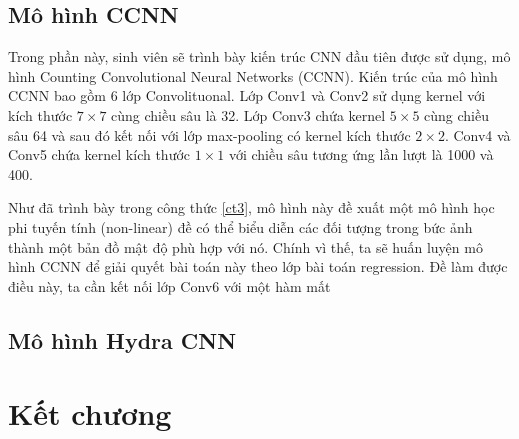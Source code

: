 \subsection{Mô hình CCNN}
	Trong phần này, sinh viên sẽ trình bày kiến trúc CNN đầu tiên được sử dụng, mô hình Counting Convolutional Neural Networks (CCNN). Kiến trúc của mô hình CCNN bao gồm 6 lớp Convolituonal. Lớp Conv1 và Conv2 sử dụng kernel với kích thước $7 \times 7$ cùng chiều sâu là 32. Lớp Conv3 chứa kernel $5 \times 5$ cùng chiều sâu 64 và sau đó kết nối với lớp max-pooling có kernel kích thước $2 \times 2$. Conv4 và Conv5 chứa kernel kích thước $1 \times 1$ với chiều sâu tương ứng lần lượt là 1000 và 400. \par 
	Như đã trình bày trong công thức \eqref{ct3}, mô hình này đề xuất một mô hình học phi tuyến tính (non-linear) đề có thể biểu diễn các đối tượng trong bức ảnh thành một bản đồ mật độ phù hợp với nó. Chính vì thế, ta sẽ huấn luyện mô hình CCNN để giải quyết bài toán này theo lớp bài toán regression. Đề làm được điều này, ta cần kết nối lớp Conv6 với một hàm mất  
\subsection{Mô hình Hydra CNN}
\section{Kết chương}


